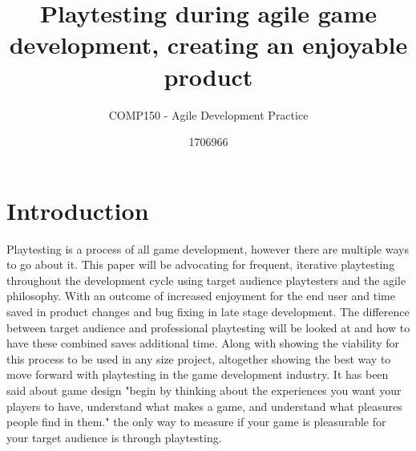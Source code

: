 \documentclass{scrartcl}
\title{Playtesting during agile game development, creating an enjoyable product}
\subtitle{COMP150 - Agile Development Practice}
\author{1706966}
\begin{document}
	
	\maketitle
	
	
	\section{Introduction}
	
	Playtesting is a process of all game development, however there are multiple ways to go about it. This paper will be advocating for frequent, iterative playtesting throughout the development cycle using target audience playtesters and the agile philosophy\cite{fowler2001agile}. With an outcome of increased enjoyment for the end user and time saved in product changes and bug fixing in late stage development. The difference between target audience and professional playtesting will be looked at and how to have these combined saves additional time. Along with showing the viability for this process to be used in any size project, altogether showing the best way to move forward with playtesting in the game development industry. It has been said about game design "begin by thinking about the experiences you want your players to have, understand what makes a game, and understand what pleasures people find in them."\cite{costikyan2005have} the only way to measure if your game is pleasurable for your target audience is through playtesting.
	
\end{document}
